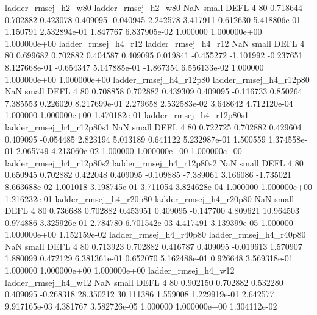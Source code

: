      ladder_rmsej_h2_w80      ladder_rmsej_h2_w80                   NaN      small     DEFL                 4 80 0.718644       0.702882 0.423078       0.409095   -0.040945      2.242578      3.417911     0.612630   5.418806e-01  1.150791 2.532894e-01     1.847767   6.837905e-02            1.000000    1.000000e+00        1.000000e+00
     ladder_rmsej_h4_r12      ladder_rmsej_h4_r12                   NaN      small     DEFL                 4 80 0.699682       0.702882 0.404587       0.409095    0.019841     -0.455272     -1.101992    -0.237651   8.127668e-01 -0.654347 5.147885e-01    -1.867354   6.556133e-02            1.000000    1.000000e+00        1.000000e+00
  ladder_rmsej_h4_r12p80   ladder_rmsej_h4_r12p80                   NaN      small     DEFL                 4 80 0.708858       0.702882 0.439309       0.409095   -0.116733      0.850264      7.385553     0.226020   8.217699e-01  2.279658 2.532583e-02     3.648642   4.712120e-04            1.000000    1.000000e+00        1.470182e-01
ladder_rmsej_h4_r12p80s1 ladder_rmsej_h4_r12p80s1                   NaN      small     DEFL                 4 80 0.722725       0.702882 0.429604       0.409095   -0.054485      2.823194      5.013189     0.641122   5.232987e-01  1.500559 1.374558e-01     2.065749   4.213060e-02            1.000000    1.000000e+00        1.000000e+00
ladder_rmsej_h4_r12p80s2 ladder_rmsej_h4_r12p80s2                   NaN      small     DEFL                 4 80 0.650945       0.702882 0.422048       0.409095   -0.109885     -7.389061      3.166086    -1.735021   8.663688e-02  1.001018 3.198745e-01     3.711054   3.824628e-04            1.000000    1.000000e+00        1.216232e-01
  ladder_rmsej_h4_r20p80   ladder_rmsej_h4_r20p80                   NaN      small     DEFL                 4 80 0.736688       0.702882 0.453951       0.409095   -0.147700      4.809621     10.964503     0.974886   3.325926e-01  2.784780 6.701542e-03     4.417491   3.139399e-05            1.000000    1.000000e+00        1.152159e-02
  ladder_rmsej_h4_r40p80   ladder_rmsej_h4_r40p80                   NaN      small     DEFL                 4 80 0.713923       0.702882 0.416787       0.409095   -0.019613      1.570907      1.880099     0.472129   6.381361e-01  0.652070 5.162488e-01     0.926648   3.569318e-01            1.000000    1.000000e+00        1.000000e+00
     ladder_rmsej_h4_w12      ladder_rmsej_h4_w12                   NaN      small     DEFL                 4 80 0.902150       0.702882 0.532280       0.409095   -0.268318     28.350212     30.111386     1.559008   1.229919e-01  2.642577 9.917165e-03     4.381767   3.582726e-05            1.000000    1.000000e+00        1.304112e-02
